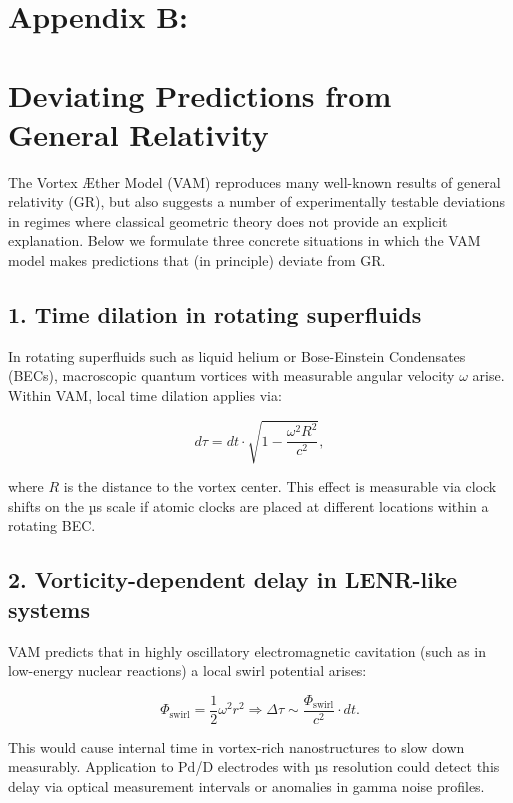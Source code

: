 \documentclass[a4paper,12pt]{article}
\begin{document}
\section*{Appendix B:}
\label{appendix:DeviatingPredictions}
\section*{Deviating Predictions from General Relativity}
The Vortex Æther Model (VAM) reproduces many well-known results of general relativity (GR), but also suggests a number of experimentally testable deviations in regimes where classical geometric theory does not provide an explicit explanation. Below we formulate three concrete situations in which the VAM model makes predictions that (in principle) deviate from GR.

\subsection*{1. Time dilation in rotating superfluids}

In rotating superfluids such as liquid helium or Bose-Einstein Condensates (BECs), macroscopic quantum vortices with measurable angular velocity \( \omega \) arise. Within VAM, local time dilation applies via:

\begin{equation}
d\tau = dt \cdot \sqrt{1 - \frac{\omega^2 R^2}{c^2}},
\end{equation}

where \( R \) is the distance to the vortex center. This effect is measurable via clock shifts on the µs scale if atomic clocks are placed at different locations within a rotating BEC.

\subsection*{2. Vorticity-dependent delay in LENR-like systems}

VAM predicts that in highly oscillatory electromagnetic cavitation (such as in low-energy nuclear reactions) a local swirl potential arises:

\begin{equation}
\Phi_\text{swirl} = \frac{1}{2} \omega^2 r^2 \Rightarrow \Delta \tau \sim \frac{\Phi_\text{swirl}}{c^2} \cdot dt.
\end{equation}

This would cause internal time in vortex-rich nanostructures to slow down measurably. Application to Pd/D electrodes with µs resolution could detect this delay via optical measurement intervals or anomalies in gamma noise profiles.
\end{document}
